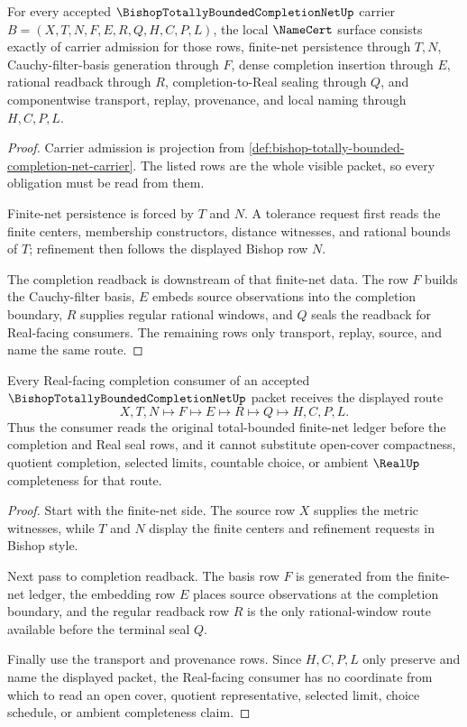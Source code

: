 \begin{theorem}
\label{thm:bishop-totally-bounded-completion-net-namecert-obligations}
For every accepted $\BishopTotallyBoundedCompletionNetUp$ carrier $B=(X,T,N,F,E,R,Q,H,C,P,L)$, the local $\NameCert$ surface consists exactly of carrier admission for those rows, finite-net persistence through $T,N$, Cauchy-filter-basis generation through $F$, dense completion insertion through $E$, rational readback through $R$, completion-to-Real sealing through $Q$, and componentwise transport, replay, provenance, and local naming through $H,C,P,L$.
\end{theorem}
\begin{proof}
Carrier admission is projection from \autoref{def:bishop-totally-bounded-completion-net-carrier}. The listed rows are the whole visible packet, so every obligation must be read from them.

Finite-net persistence is forced by $T$ and $N$. A tolerance request first reads the finite centers, membership constructors, distance witnesses, and rational bounds of $T$; refinement then follows the displayed Bishop row $N$.

The completion readback is downstream of that finite-net data. The row $F$ builds the Cauchy-filter basis, $E$ embeds source observations into the completion boundary, $R$ supplies regular rational windows, and $Q$ seals the readback for Real-facing consumers. The remaining rows only transport, replay, source, and name the same route.
\end{proof}

\begin{theorem}
\label{thm:bishop-totally-bounded-completion-net-real-seal-handoff}
Every Real-facing completion consumer of an accepted $\BishopTotallyBoundedCompletionNetUp$ packet receives the displayed route
$$
X,T,N \longmapsto F \longmapsto E \longmapsto R \longmapsto Q \longmapsto H,C,P,L .
$$
Thus the consumer reads the original total-bounded finite-net ledger before the completion and Real seal rows, and it cannot substitute open-cover compactness, quotient completion, selected limits, countable choice, or ambient $\RealUp$ completeness for that route.
\end{theorem}
\begin{proof}
Start with the finite-net side. The source row $X$ supplies the metric witnesses, while $T$ and $N$ display the finite centers and refinement requests in Bishop style.

Next pass to completion readback. The basis row $F$ is generated from the finite-net ledger, the embedding row $E$ places source observations at the completion boundary, and the regular readback row $R$ is the only rational-window route available before the terminal seal $Q$.

Finally use the transport and provenance rows. Since $H,C,P,L$ only preserve and name the displayed packet, the Real-facing consumer has no coordinate from which to read an open cover, quotient representative, selected limit, choice schedule, or ambient completeness claim.
\end{proof}


